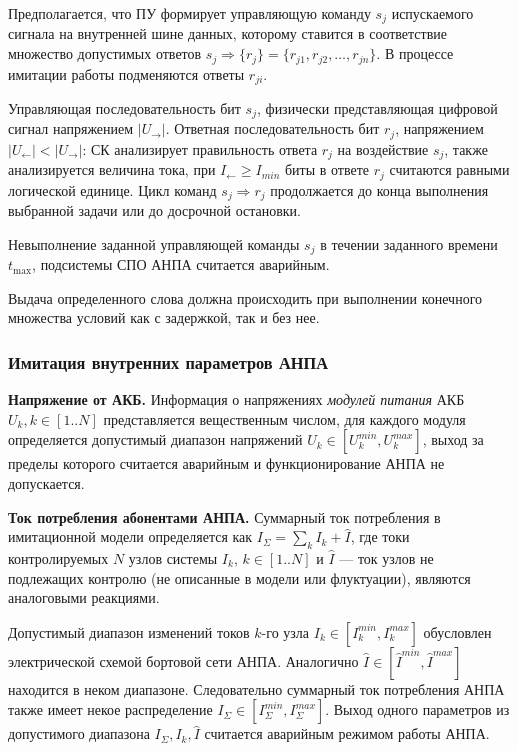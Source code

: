 Предполагается, что ПУ формирует управляющую команду $s_j$ испускаемого сигнала на внутренней шине данных,
которому ставится в соответствие множество допустимых ответов $s_j \Rightarrow \{r_j\} = \{r_{j1}, r_{j2}, \ldots, r_{jn}\}$.
В процессе имитации работы подменяются ответы $r_{ji}$.

Управляющая последовательность бит $s_j$, физически представляющая цифровой сигнал напряжением $|U_{\longrightarrow}|$.
Ответная последовательность бит $r_j$, напряжением $|U_{\longleftarrow}| < |U_{\longrightarrow}|$:
СК анализирует правильность ответа $r_j$ на воздействие $s_j$,
также анализируется величина тока, при $I_{\longleftarrow} \geq I_{min}$ биты в ответе $r_j$ считаются равными логической единице.
Цикл команд $s_j \Rightarrow r_j$ продолжается до конца выполнения выбранной задачи или до досрочной остановки.

Невыполнение заданной управляющей команды $s_j$ в течении заданного времени $t_{\mbox{max}}$,
подсистемы СПО АНПА считается аварийным.

Выдача определенного слова должна происходить при выполнении конечного множества условий как с задержкой, так и без нее.


\subsubsection{Имитация внутренних параметров АНПА}\label{sec:model_anpa:inner_params}
\textbf{Напряжение от АКБ.}
Информация о напряжениях \textit{модулей питания} АКБ $U_k, k\in [1..N]$ представляется вещественным числом,
для каждого модуля определяется допустимый диапазон напряжений $U_k \in [U_k^{min}, U_k^{max}]$,
выход за пределы которого считается аварийным и функционирование АНПА не допускается.

\textbf{Ток потребления абонентами АНПА.}
Суммарный ток потребления в имитационной модели определяется как $I_\Sigma = \sum_k I_k + \hat I$,
где токи контролируемых $N$ узлов системы $I_k,\, k\in[1..N]$ и $\hat I$ --- ток узлов не подлежащих контролю (не описанные в модели или флуктуации),
являются аналоговыми реакциями. %

Допустимый диапазон изменений токов $k$-го узла $I_k \in [I_k^{min}, I_k^{max}]$ обусловлен электрической схемой бортовой сети АНПА.
Аналогично $\hat I \in [\hat I^{min}, \hat I^{max}]$ находится в неком диапазоне.
Следовательно суммарный ток потребления АНПА также имеет некое распределение $I_\Sigma \in [I_\Sigma^{min}, I_\Sigma^{max}]$.
Выход одного параметров из допустимого диапазона $I_\Sigma, I_k, \hat I$ считается аварийным режимом работы АНПА.

